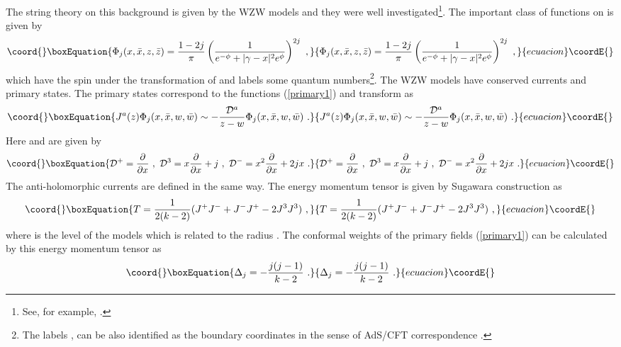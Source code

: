 \documentclass[a4paper,12pt]{article}
\providecommand{\bc}{\mathbb C}
\providecommand{\cD}{{\cal D}}
\begin{document}
The string theory on this background is given by the
\myHighlight{$SL(2,\bc)/SU(2)$}\coordHE{} WZW models and they were well investigated\footnote{
See, for example, \cite{Gawedzki}.}.
The important class of functions on \coordHE{} is given by
\begin{equation}\coord{}\boxEquation{
 \Phi_j (x,\bar{x},z,\bar{z}) = \frac{1 - 2j}{\pi} \left(
 \frac{1}{e^{-\phi} + | \gamma - x | ^2 e^{\phi} }
\right)^{2 j} ~,
\label{primary1}
}{
 \Phi_j (x,\bar{x},z,\bar{z}) = \frac{1 - 2j}{\pi} \left(
 \frac{1}{e^{-\phi} + | \gamma - x | ^2 e^{\phi} }
\right)^{2 j} ~,
}{ecuacion}\coordE{}\end{equation} 
which have the spin \coordHE{} under the transformation of \myHighlight{$SL(2,\bc)$}\coordHE{} and 
\coordHE{} labels some quantum numbers\footnote{
The labels \coordHE{}, \coordHE{} can be also identified as the boundary
coordinates in the sense of AdS/CFT correspondence \cite{AdSCFT}.
}.
The \myHighlight{$SL(2,\bc)/SU(2)$}\coordHE{} WZW models have conserved currents and primary
states.
The primary states correspond to the functions (\ref{primary1}) and transform
as
\begin{equation}\coord{}\boxEquation{
 J^a (z) \Phi_j (x,\bar{x},w,\bar{w}) \sim 
 - \frac{\cD^a}{z-w} \Phi_j (x,\bar{x},w,\bar{w}) ~.
\label{primary2}
}{
 J^a (z) \Phi_j (x,\bar{x},w,\bar{w}) \sim 
 - \frac{\cD^a}{z-w} \Phi_j (x,\bar{x},w,\bar{w}) ~.
}{ecuacion}\coordE{}\end{equation}  
Here \coordHE{} and \myHighlight{$\cD^a$}\coordHE{} are given by
\begin{equation}\coord{}\boxEquation{
 \cD^+ = \frac{\partial}{\partial x} ~,~
 \cD^3 = x \frac{\partial}{\partial x} + j ~,~
 \cD^- = x^2 \frac{\partial}{\partial x} + 2jx ~.
}{
 \cD^+ = \frac{\partial}{\partial x} ~,~
 \cD^3 = x \frac{\partial}{\partial x} + j ~,~
 \cD^- = x^2 \frac{\partial}{\partial x} + 2jx ~.
}{ecuacion}\coordE{}\end{equation} 
The anti-holomorphic currents are defined in the same way.
The energy momentum tensor is given by Sugawara construction as
\begin{equation}\coord{}\boxEquation{
 T = \frac{1}{2(k-2)} ( J^+ J^- + J^- J^+ - 2 J^3 J^3 ) ~,
}{
 T = \frac{1}{2(k-2)} ( J^+ J^- + J^- J^+ - 2 J^3 J^3 ) ~,
}{ecuacion}\coordE{}\end{equation}
where \coordHE{} is the level of the models which is related to the radius \coordHE{}. 
The conformal weights of the primary fields
(\ref{primary1}) can be calculated by this energy momentum tensor as
\begin{equation}\coord{}\boxEquation{
 \Delta_j = - \frac{j(j-1)}{k-2}~. 
}{
 \Delta_j = - \frac{j(j-1)}{k-2}~. 
}{ecuacion}\coordE{}\end{equation}
\end{document}
